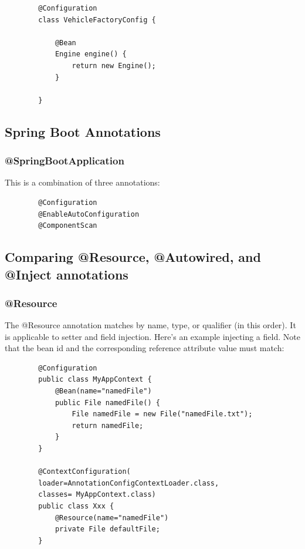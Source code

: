 \documentclass{scrartcl}
\begin{document}
    \begin{lstlisting}
        @Configuration
        class VehicleFactoryConfig {

            @Bean
            Engine engine() {
                return new Engine();
            }

        }
    \end{lstlisting}


\subsection{Spring Boot Annotations}
\subsubsection{@SpringBootApplication}

    This is a combination of three annotations:

    \begin{lstlisting}
        @Configuration
        @EnableAutoConfiguration
        @ComponentScan
    \end{lstlisting}

\subsection{Comparing @Resource, @Autowired, and @Inject annotations}
\subsubsection{@Resource}

    The @Resource annotation matches by name, type, or qualifier (in this order). It is applicable to setter and field injection.
    Here’s an example injecting a field. Note that the bean id and the corresponding reference attribute value must match:

    \begin{lstlisting}
        @Configuration
        public class MyAppContext {
            @Bean(name="namedFile")
            public File namedFile() {
                File namedFile = new File("namedFile.txt");
                return namedFile;
            }
        }

        @ContextConfiguration(
        loader=AnnotationConfigContextLoader.class,
        classes= MyAppContext.class)
        public class Xxx {
            @Resource(name="namedFile")
            private File defaultFile;
        }
    \end{lstlisting}
\end{document}
